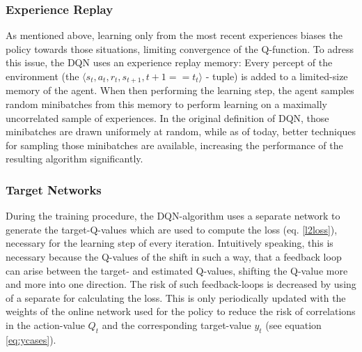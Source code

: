\subsubsection*{Experience Replay}
As mentioned above, learning only from the most recent experiences biases the policy towards those situations, limiting convergence of the Q-function. To adress this issue, the DQN uses an experience replay memory: Every percept of the environment (the $\langle s_t, a_t, r_t, s_{t+1}, t+1==t_t \rangle$ - tuple) is added to a limited-size memory of the agent. When then performing the learning step, the agent samples random minibatches from this memory to perform learning on a maximally uncorrelated sample of experiences. In the original definition of DQN, those minibatches are drawn uniformely at random, while as of today, better techniques for sampling those minibatches are available\cite{schaul_prioritized_2015}, increasing the performance of the resulting algorithm significantly. %

\subsubsection*{Target Networks}
During the training procedure, the DQN-algorithm uses a separate network to generate the target-Q-values which are used to compute the loss (eq. \ref{l2loss}), necessary for the learning step of every iteration. Intuitively speaking, this is necessary because the Q-values of the  shift in such a way, that a feedback loop can arise between the target- and estimated Q-values, shifting the Q-value more and more into one direction. %
The risk of such feedback-loops is decreased by using of a separate  for calculating the loss. This is only periodically updated with the weights of the online network used for the policy to reduce the risk of correlations in the action-value $Q_t$ and the corresponding target-value $y_t$ (see equation \ref{eq:ycases}).

